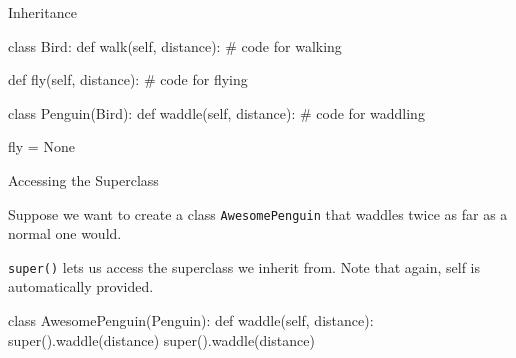 \begin{frame}[fragile]{Inheritance}

    \begin{pythoncode}
    class Bird:
        def walk(self, distance):
            # code for walking

        def fly(self, distance):
            # code for flying

    class Penguin(Bird):
        def waddle(self, distance):
            # code for waddling

        fly = None
    \end{pythoncode}


\end{frame}

\begin{frame}[fragile]{Accessing the Superclass}

    Suppose we want to create a class {\tt AwesomePenguin} that waddles twice as far as a normal one would.

    \begin{block}{}
        {\tt super()} lets us access the superclass we inherit from. Note that again, self is automatically provided.
    \end{block}

    \begin{pythoncode}
    class AwesomePenguin(Penguin):
        def waddle(self, distance):
            super().waddle(distance)
            super().waddle(distance)
    \end{pythoncode}

\end{frame}

